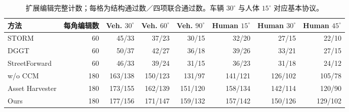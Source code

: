 \begin{table}[H]
\centering\small
\setlength{\tabcolsep}{3pt}
\caption{扩展编辑完整计数；每格为结构通过数／四项联合通过数。车辆 $30^\circ$ 与人体 $15^\circ$ 对应基本协议。}
\label{tab:extended-edit-counts}
\begin{tabular}{@{}lrrrrrrr@{}}
\toprule
方法 & 每角编辑数 & Veh. $30^\circ$ & Veh. $60^\circ$ & Veh. $90^\circ$ & Human $15^\circ$ & Human $30^\circ$ & Human $45^\circ$ \\
\midrule
STORM & 60 & 45/33 & 37/23 & 30/15 & 32/20 & 27/15 & 22/10 \\
DGGT & 60 & 50/37 & 42/27 & 36/18 & 39/26 & 33/21 & 27/15 \\
StreetForward & 60 & 46/33 & 39/24 & 31/15 & 36/23 & 31/18 & 24/12 \\
w/o CCM & 180 & 163/138 & 150/123 & 131/97 & 141/121 & 126/102 & 105/78 \\
Asset Harvester & 180 & 173/155 & 162/139 & 151/120 & 158/134 & 142/114 & 120/90 \\
Ours & 180 & 177/156 & 171/147 & 159/132 & 157/142 & 150/126 & 129/102 \\
\bottomrule
\end{tabular}
\end{table}


